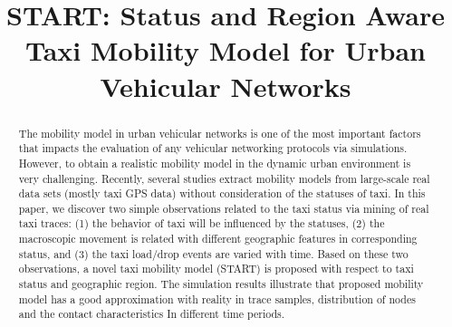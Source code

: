 \documentclass[10pt,conference,compsocconf,letterpaper]{IEEEtran}
\begin{document}
\title{START: Status and Region Aware Taxi Mobility Model for Urban Vehicular Networks}

\author{
}
\maketitle

\begin{abstract}
The mobility model in urban vehicular networks is one of the most important factors that impacts the evaluation of any vehicular networking protocols via simulations. However, to obtain a realistic mobility model in the dynamic urban environment is very challenging. Recently, several studies extract mobility models from large-scale real data sets (mostly taxi GPS data) without consideration of the statuses of taxi. In this paper, we discover two simple observations related to the taxi status via mining of real taxi traces: (1) the behavior of taxi will be influenced by the statuses, (2) the macroscopic movement is related with different geographic features in corresponding status, and  (3) the taxi load/drop events are varied with time. Based on these two observations, a novel taxi mobility model (START) is proposed with respect to taxi status and geographic region. The simulation results illustrate that proposed mobility model has a good approximation with reality in trace samples, distribution of nodes and the contact characteristics  In different time periods.
\end{abstract}
\end{document}
